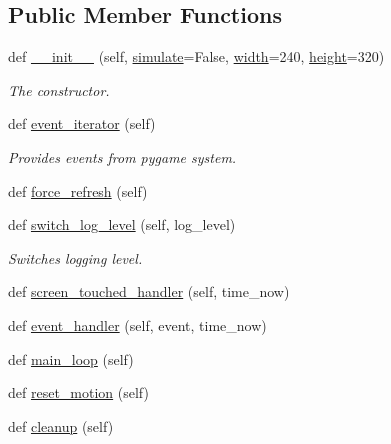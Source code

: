 \subsection*{Public Member Functions}
\begin{DoxyCompactItemize}
\item 
def \hyperlink{classocc_1_1open__cycling__computer_a1824c27f6e2c486c8b50f898db74d077}{\+\_\+\+\_\+init\+\_\+\+\_\+} (self, \hyperlink{classocc_1_1open__cycling__computer_a9bf952f2299899216b9adf8c382db024}{simulate}=False, \hyperlink{classocc_1_1open__cycling__computer_a56f3dab67d5bff0740ffbd8654d55582}{width}=240, \hyperlink{classocc_1_1open__cycling__computer_a2215795145291166265958493e692bab}{height}=320)
\begin{DoxyCompactList}\small\item\em The constructor. \end{DoxyCompactList}\item 
def \hyperlink{classocc_1_1open__cycling__computer_a4283facb6ffb6ed36e30bd9e3ed61871}{event\+\_\+iterator} (self)
\begin{DoxyCompactList}\small\item\em Provides events from pygame system. \end{DoxyCompactList}\item 
def \hyperlink{classocc_1_1open__cycling__computer_abff79cda8ca077b0bd319e08214dd6d3}{force\+\_\+refresh} (self)
\item 
def \hyperlink{classocc_1_1open__cycling__computer_a26649854452d1afcfebf0b3d17ac347d}{switch\+\_\+log\+\_\+level} (self, log\+\_\+level)
\begin{DoxyCompactList}\small\item\em Switches logging level. \end{DoxyCompactList}\item 
def \hyperlink{classocc_1_1open__cycling__computer_aea92ce48f815f4c3f3d56faab3ca025d}{screen\+\_\+touched\+\_\+handler} (self, time\+\_\+now)
\item 
def \hyperlink{classocc_1_1open__cycling__computer_a98a9ab4fb8dbd4df267ee216ef53d895}{event\+\_\+handler} (self, event, time\+\_\+now)
\item 
def \hyperlink{classocc_1_1open__cycling__computer_a6686554a1a2f2517d3ab46abb2bb35c2}{main\+\_\+loop} (self)
\item 
def \hyperlink{classocc_1_1open__cycling__computer_aa6adec92226434376a10fc852ebf6dc6}{reset\+\_\+motion} (self)
\item 
def \hyperlink{classocc_1_1open__cycling__computer_a1f6bf75367d3617a7b5c0e182c27e890}{cleanup} (self)
\end{DoxyCompactItemize}
